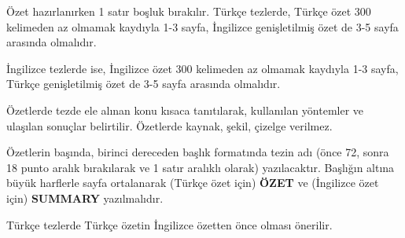 \vspace*{-6pt}
\"Ozet haz\i rlan\i rken 1 sat\i r bo\c{s}luk b\i rak\i l\i r. T\"urk\c{c}e
tezlerde, T\"urk\c{c}e \"ozet 300 kelimeden az olmamak kayd\i yla 1-3 sayfa,
{\.I}ngilizce geni\c{s}letilmi\c{s} \"ozet de 3-5 sayfa aras\i nda 
olmal\i d\i r. 

{\.I}ngilizce tezlerde ise, {\.I}ngilizce \"ozet 300 kelimeden az olmamak
kayd\i yla 1-3 sayfa, T\"urk\c{c}e geni\c{s}letilmi\c{s} \"ozet de 
3-5 sayfa aras\i nda olmal\i d\i r. 

\"Ozetlerde tezde ele al\i nan konu k\i saca tan\i t\i larak, kullan\i lan
y\"ontemler ve ula\c{s}\i lan sonu\c{c}lar belirtilir. \"Ozetlerde kaynak, 
\c{s}ekil, \c{c}izelge verilmez.

\"Ozetlerin ba\c{s}\i nda, birinci dereceden ba\c{s}l\i k format\i nda
tezin ad{\i} (\"once 72, sonra 18 punto aral\i k b{\i}rak{\i}larak ve 1
sat\i r aral\i kl{\i} olarak) yaz\i lacakt\i r. Ba\c{s}l\i \u{g}\i n
alt\i na b\"uy\"uk harflerle sayfa ortalanarak (T\"urk\c{c}e \"ozet i\c{c}in)
{\bf \"OZET} ve ({\.I}ngilizce \"ozet i\c{c}in) {\bf SUMMARY}
yaz\i lmal\i d\i r.

T\"urk\c{c}e tezlerde T\"urk\c{c}e \"ozetin \.Ingilizce \"ozetten 
\"once olmas{\i} \"onerilir.
